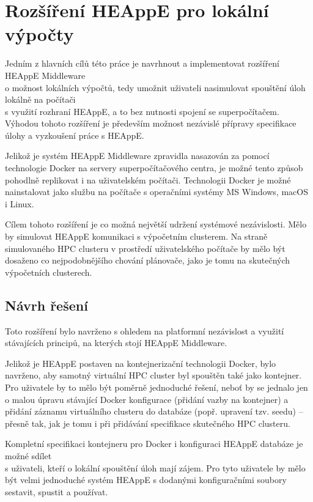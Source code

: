 \chapter{Rozšíření HEAppE pro lokální výpočty}
Jedním z hlavních cílů této práce je navrhnout a implementovat rozšíření HEAppE Middleware \\o možnost lokálních výpočtů, tedy umožnit uživateli nasimulovat spouštění úloh lokálně na počítači \\s využití rozhraní HEAppE, a to bez nutnosti spojení se superpočítačem. Výhodou tohoto rozšíření je především možnost nezávislé přípravy specifikace úlohy a vyzkoušení práce s HEAppE.

Jelikož je systém HEAppE Middleware zpravidla nasazován za pomocí technologie Docker na servery superpočítačového centra, je možné tento způsob pohodlně replikovat i na uživatelském počítači. Technologii Docker je možné nainstalovat jako službu na počítače s operačními systémy MS Windows, macOS i Linux.

Cílem tohoto rozšíření je co možná největší udržení systémové nezávislosti. Mělo by simulovat HEAppE komunikaci s výpočetním clusterem. Na straně simulovaného HPC clusteru v prostředí uživatelského počítače by mělo být dosaženo co nejpodobnějšího chování plánovače, jako je tomu na skutečných výpočetních clusterech.

\section{Návrh řešení}
Toto rozšíření bylo navrženo s ohledem na platformní nezávislost a využití stávajících principů, na kterých stojí HEAppE Middleware.

Jelikož je HEAppE postaven na kontejnerizační technologii Docker, bylo navrženo, aby samotný virtuální HPC cluster byl spouštěn také jako kontejner. Pro uživatele by to mělo být poměrně jednoduché řešení, neboť by se jednalo jen o malou úpravu stávající Docker konfigurace (přidání vazby na kontejner) a přidání záznamu virtuálního clusteru do databáze (popř. upravení tzv. seedu) – přesně tak, jak je tomu i při přidávání specifikace skutečného HPC clusteru.

Kompletní specifikaci kontejneru pro Docker i konfiguraci HEAppE databáze je možné sdílet \\s uživateli, kteří o lokální spouštění úloh mají zájem. Pro tyto uživatele by mělo být velmi jednoduché systém HEAppE s dodanými konfiguračními soubory sestavit, spustit a používat. 

